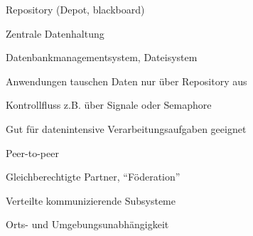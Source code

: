 \documentclass[a4paper]{article}
\begin{document}
\begin{multicols}{3}
  Repository (Depot, blackboard)
  \begin{itemize*}
    \item Zentrale Datenhaltung
    \begin{itemize*}
      \item Datenbankmanagementsystem, Dateisystem
    \end{itemize*}
    \item Anwendungen tauschen Daten nur über Repository aus
    \item Kontrollfluss z.B. über Signale oder Semaphore
    \item Gut für datenintensive Verarbeitungsaufgaben geeignet
  \end{itemize*}

  Peer-to-peer
  \begin{itemize*}
    \item Gleichberechtigte Partner, “Föderation”
    \item Verteilte kommunizierende Subsysteme
    \item Orts- und Umgebungsunabhängigkeit
  \end{itemize*}


\end{multicols}
\end{document}
